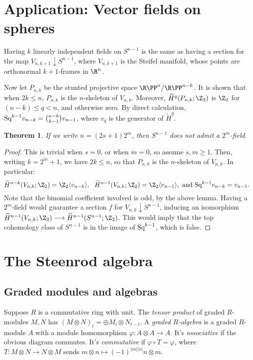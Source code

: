 \documentclass[11pt]{article}
\renewcommand{\phi}{\varphi}
\newcommand{\Squ}{\textup{Sq}}
\theoremstyle{plain}
\newtheorem*{thm*}{Theorem}
\theoremstyle{definition}
\renewcommand{\to}{\longrightarrow}
\renewcommand{\mapsto}{\longmapsto}
\newcommand{\RP}{{\R\PP}}
\begin{document}
\section{Application: Vector fields on spheres}
Having $k$ linearly independent fields on $S^{n-1}$ is the same as having a section for the map $V_{n,k+1}\downarrow S^{n-1}$, where $V_{n,k+1}$ is the Steifel manifold, whose points are orthonormal $k+1$-frames in $\R^n$. 

Now let $P_{n,k}$ be the stunted projective space $\RP^n/\RP^{n-k}$. It is shown that when $2k\leq n$, $P_{n,k}$ is the $n$-skeleton of $V_{n,k}$. Moreover, $\widetilde H^q(P_{n,k};\Z_2)$ is $\Z_2$ for $(n-k)\leq q<n$, and otherwise zero. By direct calculation, $\Squ^{k-1}v_{n-k}={n-k\choose k-1}v_{n-1}$, where $v_q$ is the generator of $\widetilde H^q$.
\begin{thm*}
If we write $n=(2s+1)2^m$, then $S^{n-1}$ does not admit a $2^m$-field.
\end{thm*}
\begin{proof}
This is trivial when $s=0$, or when $m=0$, so assume $s,m\geq1$. Then, writing $k=2^m+1$, we have $2k\leq n$, so that $P_{n,k}$ is the $n$-skeleton of $V_{n,k}$. In particular: \[\widetilde H^{n-k}(V_{n,k};\Z_2)=\Z_2\langle v_{n-k}\rangle,\ \ \widetilde H^{n-1}(V_{n,k};\Z_2)=\Z_2\langle v_{n-1}\rangle,\text{ and }\Squ^{k-1}v_{n-k}=v_{n-1}.\]
Note that the binomial coefficient involved is odd, by the above lemma.
Having a $2^m$-field would guarantee a section $f$ for $V_{n,k}\downarrow S^{n-1}$, inducing an  isomorphism $\widetilde H^{n-1}(V_{n,k};\Z_2)\to\widetilde H^{n-1}(S^{n-1};\Z_2)$. This would imply that the top cohomology class of $S^{n-1}$ is in the image of $\Squ^{k-1}$, which is false.
\end{proof}

\section{The Steenrod algebra}
\subsection{Graded modules and algebras}
Suppose $R$ is a commutative ring with unit. The \emph{tensor product} of graded $R$-modules $M,N$ has $(M\otimes N)_t=\oplus M_{i}\otimes N_{t-i}$. A \emph{graded $R$-algebra} is a graded $R$-module $A$ with a module homomorphism $\phi:A\otimes A\to A$. It's \emph{associative} if the obvious diagram commutes. It's \emph{commutative} if $\phi\circ T=\phi$, where $T:M\otimes N\to N\otimes M$ sends $m\otimes n\mapsto (-1)^{|m||n|}n\otimes m$.
\end{document}

